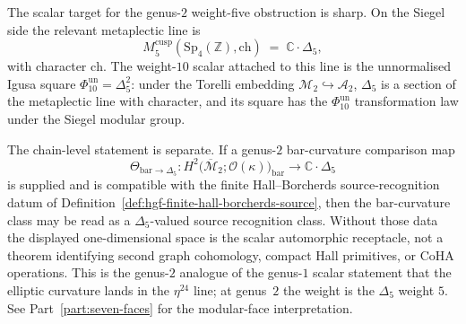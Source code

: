 \begin{remark}
\label{rem:hgf-H2-classification}
The scalar target for the genus-$2$ weight-five obstruction is sharp.
On the Siegel side the relevant metaplectic line is
\[
M_5^{\mathrm{cusp}}(\mathrm{Sp}_4(\mathbb Z),\mathrm{ch})
\;=\;
\mathbb{C} \cdot \Delta_5,
\]
with character $\mathrm{ch}$. The weight-$10$ scalar attached to this
line is the unnormalised Igusa square
$\Phi_{10}^{\mathrm{un}}=\Delta_5^2$: under the Torelli embedding
$\mathcal{M}_2 \hookrightarrow \mathcal{A}_2$, $\Delta_5$ is a
section of the metaplectic line with character, and its square has the
$\Phi_{10}^{\mathrm{un}}$ transformation law under the Siegel modular
group.

The chain-level statement is separate. If a genus-$2$ bar-curvature
comparison map
\[
\Theta_{\mathrm{bar}\to\Delta_5}\colon
H^{2}\bigl(\overline{\mathcal{M}}_2;\mathcal O(\kappa)\bigr)_{\mathrm{bar}}
\longrightarrow
\mathbb C\cdot\Delta_5
\]
is supplied and is compatible with the finite Hall--Borcherds
source-recognition datum of
Definition~\ref{def:hgf-finite-hall-borcherds-source}, then the
bar-curvature class may be read as a $\Delta_5$-valued source
recognition class. Without those data the displayed one-dimensional
space is the scalar automorphic receptacle, not a theorem identifying
second graph cohomology, compact Hall primitives, or CoHA operations.
This is the genus-$2$ analogue of the genus-$1$ scalar statement that
the elliptic curvature lands in the $\eta^{24}$ line; at genus~$2$ the
weight is the $\Delta_5$ weight $5$. See Part~\ref{part:seven-faces}
for the modular-face interpretation.
\end{remark}

